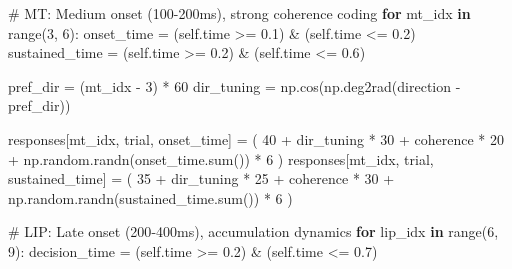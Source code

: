 \documentclass[
  11pt,
  letterpaper,
  oneside,
  openany]{book}
\newenvironment{Shaded}{\begin{snugshade}}{\end{snugshade}}
\newcommand{\BuiltInTok}[1]{\textcolor[rgb]{0.00,0.23,0.31}{#1}}
\newcommand{\CommentTok}[1]{\textcolor[rgb]{0.37,0.37,0.37}{#1}}
\newcommand{\ControlFlowTok}[1]{\textcolor[rgb]{0.00,0.23,0.31}{\textbf{#1}}}
\newcommand{\DecValTok}[1]{\textcolor[rgb]{0.68,0.00,0.00}{#1}}
\newcommand{\FloatTok}[1]{\textcolor[rgb]{0.68,0.00,0.00}{#1}}
\newcommand{\KeywordTok}[1]{\textcolor[rgb]{0.00,0.23,0.31}{\textbf{#1}}}
\newcommand{\NormalTok}[1]{\textcolor[rgb]{0.00,0.23,0.31}{#1}}
\newcommand{\OperatorTok}[1]{\textcolor[rgb]{0.37,0.37,0.37}{#1}}
\newcommand{\VariableTok}[1]{\textcolor[rgb]{0.07,0.07,0.07}{#1}}
\begin{document}
\begin{Shaded}
\begin{Highlighting}[]
            \CommentTok{\# MT: Medium onset (100{-}200ms), strong coherence coding}
            \ControlFlowTok{for}\NormalTok{ mt\_idx }\KeywordTok{in} \BuiltInTok{range}\NormalTok{(}\DecValTok{3}\NormalTok{, }\DecValTok{6}\NormalTok{):}
\NormalTok{                onset\_time }\OperatorTok{=}\NormalTok{ (}\VariableTok{self}\NormalTok{.time }\OperatorTok{\textgreater{}=} \FloatTok{0.1}\NormalTok{) }\OperatorTok{\&}\NormalTok{ (}\VariableTok{self}\NormalTok{.time }\OperatorTok{\textless{}=} \FloatTok{0.2}\NormalTok{)}
\NormalTok{                sustained\_time }\OperatorTok{=}\NormalTok{ (}\VariableTok{self}\NormalTok{.time }\OperatorTok{\textgreater{}=} \FloatTok{0.2}\NormalTok{) }\OperatorTok{\&}\NormalTok{ (}\VariableTok{self}\NormalTok{.time }\OperatorTok{\textless{}=} \FloatTok{0.6}\NormalTok{)}
                
\NormalTok{                pref\_dir }\OperatorTok{=}\NormalTok{ (mt\_idx }\OperatorTok{{-}} \DecValTok{3}\NormalTok{) }\OperatorTok{*} \DecValTok{60}
\NormalTok{                dir\_tuning }\OperatorTok{=}\NormalTok{ np.cos(np.deg2rad(direction }\OperatorTok{{-}}\NormalTok{ pref\_dir))}
                
\NormalTok{                responses[mt\_idx, trial, onset\_time] }\OperatorTok{=}\NormalTok{ (}
                    \DecValTok{40} \OperatorTok{+}\NormalTok{ dir\_tuning }\OperatorTok{*} \DecValTok{30} \OperatorTok{+}\NormalTok{ coherence }\OperatorTok{*} \DecValTok{20} \OperatorTok{+} 
\NormalTok{                    np.random.randn(onset\_time.}\BuiltInTok{sum}\NormalTok{()) }\OperatorTok{*} \DecValTok{6}
\NormalTok{                )}
\NormalTok{                responses[mt\_idx, trial, sustained\_time] }\OperatorTok{=}\NormalTok{ (}
                    \DecValTok{35} \OperatorTok{+}\NormalTok{ dir\_tuning }\OperatorTok{*} \DecValTok{25} \OperatorTok{+}\NormalTok{ coherence }\OperatorTok{*} \DecValTok{30} \OperatorTok{+} 
\NormalTok{                    np.random.randn(sustained\_time.}\BuiltInTok{sum}\NormalTok{()) }\OperatorTok{*} \DecValTok{6}
\NormalTok{                )}
            
            \CommentTok{\# LIP: Late onset (200{-}400ms), accumulation dynamics}
            \ControlFlowTok{for}\NormalTok{ lip\_idx }\KeywordTok{in} \BuiltInTok{range}\NormalTok{(}\DecValTok{6}\NormalTok{, }\DecValTok{9}\NormalTok{):}
\NormalTok{                decision\_time }\OperatorTok{=}\NormalTok{ (}\VariableTok{self}\NormalTok{.time }\OperatorTok{\textgreater{}=} \FloatTok{0.2}\NormalTok{) }\OperatorTok{\&}\NormalTok{ (}\VariableTok{self}\NormalTok{.time }\OperatorTok{\textless{}=} \FloatTok{0.7}\NormalTok{)}
                

\end{Highlighting}
\end{Shaded}
\end{document}
